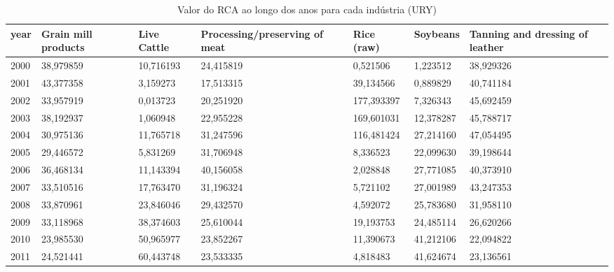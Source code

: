 \begin{table}
\centering
\caption{Valor do RCA ao longo dos anos para cada indústria (URY)}
\begin{tabular}{p{1cm}p{2cm}p{2cm}p{2cm}p{2cm}p{2cm}p{2cm}}
\toprule
 year &  Grain mill products &  Live Cattle &  Processing/preserving of meat &  Rice (raw) &  Soybeans &  Tanning and dressing of leather \\
\midrule
 2000 &            38,979859 &    10,716193 &                      24,415819 &    0,521506 &  1,223512 &                        38,929326 \\
 2001 &            43,377358 &     3,159273 &                      17,513315 &   39,134566 &  0,889829 &                        40,741184 \\
 2002 &            33,957919 &     0,013723 &                      20,251920 &  177,393397 &  7,326343 &                        45,692459 \\
 2003 &            38,192937 &     1,060948 &                      22,955228 &  169,601031 & 12,378287 &                        45,788717 \\
 2004 &            30,975136 &    11,765718 &                      31,247596 &  116,481424 & 27,214160 &                        47,054495 \\
 2005 &            29,446572 &     5,831269 &                      31,706948 &    8,336523 & 22,099630 &                        39,198644 \\
 2006 &            36,468134 &    11,143394 &                      40,156058 &    2,028848 & 27,771085 &                        40,373910 \\
 2007 &            33,510516 &    17,763470 &                      31,196324 &    5,721102 & 27,001989 &                        43,247353 \\
 2008 &            33,870961 &    23,846046 &                      29,432570 &    4,592072 & 25,783680 &                        31,958110 \\
 2009 &            33,118968 &    38,374603 &                      25,610044 &   19,193753 & 24,485114 &                        26,620266 \\
 2010 &            23,985530 &    50,965977 &                      23,852267 &   11,390673 & 41,212106 &                        22,094822 \\
 2011 &            24,521441 &    60,443748 &                      23,533335 &    4,818483 & 41,624674 &                        23,136561 \\

\end{tabular}
\end{table}
